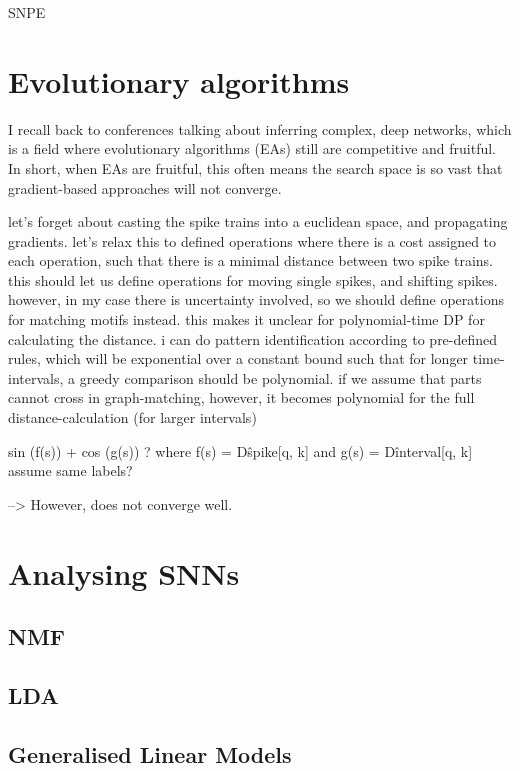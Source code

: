 \documentclass[mphil,deptreport,ai]{infthesis} %
\begin{document}
SNPE

\section{Evolutionary algorithms}
I recall back to conferences talking about inferring complex, deep networks, which is a field where evolutionary algorithms (EAs) still are competitive and fruitful.
In short, when EAs are fruitful, this often means the search space is so vast that gradient-based approaches will not converge.

let's forget about casting the spike trains into a euclidean space, and propagating gradients. let's relax this to defined operations where there is a cost assigned to each operation, such that there is a minimal distance between two spike trains. this should let us define operations for moving single spikes, and shifting spikes. however, in my case there is uncertainty involved, so we should define operations for matching motifs instead. this makes it unclear for polynomial-time DP for calculating the distance. i can do pattern identification according to pre-defined rules, which will be exponential over a constant bound such that for longer time-intervals, a greedy comparison should be polynomial.
if we assume that parts cannot cross in graph-matching, however, it becomes polynomial for the full distance-calculation (for larger intervals)

sin (f(s)) + cos (g(s)) ?
where f(s) = D\^spike[q, k]
and g(s) = D\^interval[q, k]
assume same labels?


--> However, does not converge well.


\section{Analysing SNNs}

\subsection{NMF}

\subsection{LDA}

\subsection{Generalised Linear Models}
\end{document}
